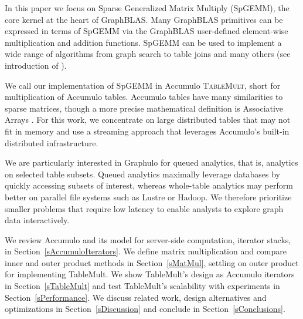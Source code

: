 
In this paper we focus on Sparse Generalized Matrix Multiply (SpGEMM), the core kernel at the heart of GraphBLAS.
Many GraphBLAS primitives can be expressed in terms of
SpGEMM via the GraphBLAS user-defined element-wise multiplication and addition functions. 
SpGEMM can be used to implement a wide range of algorithms 
from graph search \cite{kepner2011graph} to table joins \cite{cohen2009mad} 
and many others (see introduction of \cite{bulucc2010highly}).

We call our implementation of SpGEMM in Accumulo \textsc{TableMult}, short for multiplication of Accumulo tables.
Accumulo tables have many similarities to sparse matrices, though a more precise mathematical definition is Associative Arrays 
\cite{kepner2014gabb}. For this work, we concentrate on
large distributed tables that may not fit in memory and use a streaming
approach that leverages Accumulo's built-in distributed infrastructure.

We are particularly interested in Graphulo for queued analytics, that is, analytics on selected table subsets.  
Queued analytics maximally leverage  databases
by quickly accessing subsets of interest, 
whereas whole-table analytics may perform better on parallel file systems such as Lustre or Hadoop.
We therefore prioritize smaller problems that require low latency
to enable analysts to explore graph data interactively.


We review Accumulo and its model for server-side computation, iterator stacks, 
in Section~\ref{sAccumuloIterators}.
We define matrix multiplication and compare inner and outer product methods
in Section~\ref{sMatMul}, settling on outer product for implementing TableMult.
We show TableMult's design as Accumulo iterators in Section~\ref{sTableMult}
and test TableMult's scalability with experiments in Section~\ref{sPerformance}.
We discuss related work, design alternatives and optimizations in Section~\ref{sDiscussion}
and conclude in Section~\ref{sConclusions}.

